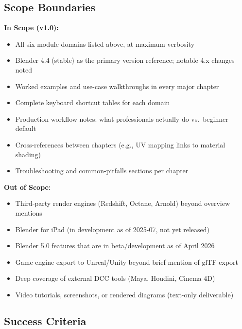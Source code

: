 \documentclass[11pt,letterpaper]{article}
\begin{document}
\subsection{Scope Boundaries}

\textbf{In Scope (v1.0):}
\begin{itemize}[leftmargin=2em]
  \item All six module domains listed above, at maximum verbosity
  \item Blender 4.4 (stable) as the primary version reference; notable 4.x changes noted
  \item Worked examples and use-case walkthroughs in every major chapter
  \item Complete keyboard shortcut tables for each domain
  \item Production workflow notes: what professionals actually do vs.\ beginner default
  \item Cross-references between chapters (e.g., UV mapping links to material shading)
  \item Troubleshooting and common-pitfalls sections per chapter
\end{itemize}

\textbf{Out of Scope:}
\begin{itemize}[leftmargin=2em]
  \item Third-party render engines (Redshift, Octane, Arnold) beyond overview mentions
  \item Blender for iPad (in development as of 2025-07, not yet released)
  \item Blender 5.0 features that are in beta/development as of April 2026
  \item Game engine export to Unreal/Unity beyond brief mention of glTF export
  \item Deep coverage of external DCC tools (Maya, Houdini, Cinema 4D)
  \item Video tutorials, screenshots, or rendered diagrams (text-only deliverable)
\end{itemize}

\subsection{Success Criteria}
\end{document}
